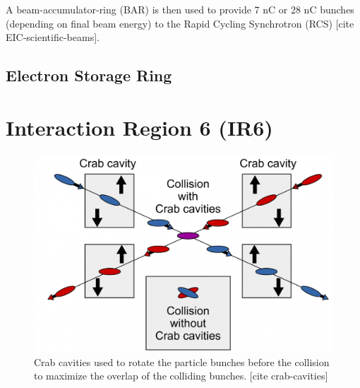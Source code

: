 A beam-accumulator-ring (BAR) is then used to provide 7 nC or 28 nC bunches (depending on final beam energy) to the Rapid Cycling Synchrotron (RCS) [cite EIC-scientific-beams]. 

\subsection{Electron Storage Ring}

\section{Interaction Region 6 (IR6)}

\begin{figure}[ht]
    \centering
    \includegraphics[width=.7\linewidth]{img/crab_cavities.jpg}
    \caption{Crab cavities used to rotate the particle bunches before the collision to maximize the overlap of the colliding bunches. [cite crab-cavities]}
    \label{fig:eic:crab}
\end{figure}



